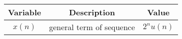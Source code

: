 \begin{tabular}{|c|c|c|} 
      \hline
\textbf{Variable}& \textbf{Description}& \textbf{Value}\\\hline
         $x(n)$& general term of sequence&$2^{n} u(n)$\\\hline
         
    \end{tabular}
